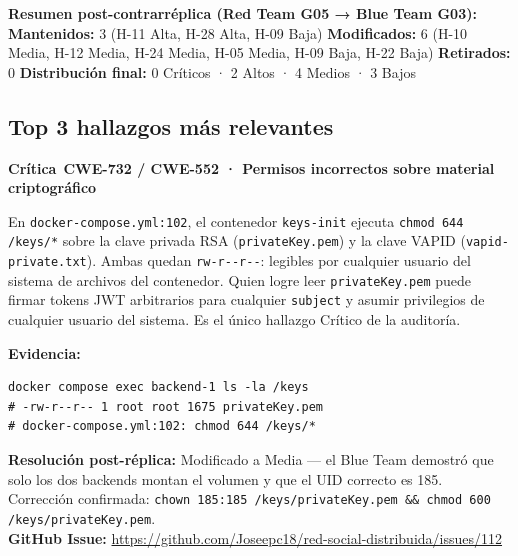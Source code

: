 \documentclass[10pt,a4paper]{article}
\newcommand{\code}[1]{\nolinkurl{#1}}
\newcommand{\badgeCritica}{\colorbox{red!20}{\textcolor{red!80!black}{\textbf{\footnotesize Crítica}}}}
\begin{document}
\vspace{0.5em}
\begin{tcolorbox}[colback=lightgray!50,colframe=upseblue!30,arc=2mm]
\small
\textbf{Resumen post-contrarréplica (Red Team G05 → Blue Team G03):}\quad
\textbf{Mantenidos:} 3 (H-11 Alta, H-28 Alta, H-09 Baja)\quad
\textbf{Modificados:} 6 (H-10 Media, H-12 Media, H-24 Media, H-05 Media, H-09 Baja, H-22 Baja)\quad
\textbf{Retirados:} 0\quad
\textbf{Distribución final:} 0 Críticos · 2 Altos · 4 Medios · 3 Bajos
\end{tcolorbox}

\subsection{Top 3 hallazgos más relevantes}

\begin{tcolorbox}[colback=red!4,colframe=redteamcolor!40,arc=2mm,title={\textbf{Top 1 — H-10 · Clave privada RSA con chmod 644 (Issue \#112)}}]
\badgeCritica\ \textbf{CWE-732 / CWE-552 · Permisos incorrectos sobre material criptográfico}

En \code{docker-compose.yml:102}, el contenedor \code{keys-init} ejecuta \code{chmod 644 /keys/*} sobre la clave privada RSA (\code{privateKey.pem}) y la clave VAPID (\code{vapid-private.txt}). Ambas quedan \code{rw-r--r--}: legibles por cualquier usuario del sistema de archivos del contenedor. Quien logre leer \code{privateKey.pem} puede firmar tokens JWT arbitrarios para cualquier \code{subject} y asumir privilegios de cualquier usuario del sistema. Es el único hallazgo Crítico de la auditoría.

\textbf{Evidencia:}
\begin{verbatim}
docker compose exec backend-1 ls -la /keys
# -rw-r--r-- 1 root root 1675 privateKey.pem
# docker-compose.yml:102: chmod 644 /keys/*
\end{verbatim}
\textbf{Resolución post-réplica:} Modificado a Media — el Blue Team demostró que solo los dos backends montan el volumen y que el UID correcto es 185. Corrección confirmada: \code{chown 185:185 /keys/privateKey.pem \&\& chmod 600 /keys/privateKey.pem}.\\
\textbf{GitHub Issue:} \url{https://github.com/Joseepc18/red-social-distribuida/issues/112}
\end{tcolorbox}
\end{document}
